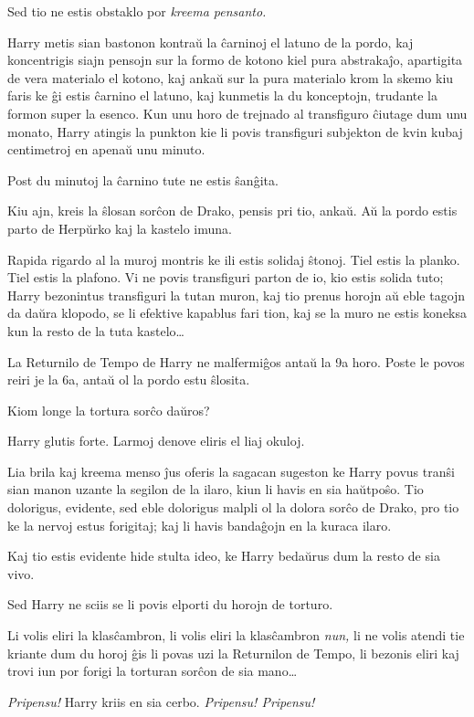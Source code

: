 Sed tio ne estis obstaklo por \emph{kreema pensanto.}

Harry metis sian bastonon kontraŭ la ĉarninoj el latuno de la pordo,
kaj koncentrigis siajn pensojn sur la formo de kotono kiel pura
abstrakaĵo, apartigita de vera materialo el kotono, kaj ankaŭ sur la
pura materialo krom la skemo kiu faris ke ĝi estis ĉarnino el latuno,
kaj kunmetis la du konceptojn, trudante la formon super la esenco. Kun
unu horo de trejnado al transfiguro ĉiutage dum unu monato, Harry
atingis la punkton kie li povis transfiguri subjekton de kvin kubaj
centimetroj en apenaŭ unu minuto.

Post du minutoj la ĉarnino tute ne estis ŝanĝita.

Kiu ajn, kreis la ŝlosan sorĉon de Drako, pensis pri tio, ankaŭ. Aŭ la
pordo estis parto de Herpŭrko kaj la kastelo imuna.

Rapida rigardo al la muroj montris ke ili estis solidaj ŝtonoj. Tiel
estis la planko. Tiel estis la plafono. Vi ne povis transfiguri parton
de io, kio estis solida tuto; Harry bezonintus transfiguri la tutan
muron, kaj tio prenus horojn aŭ eble tagojn da daŭra klopodo, se li
efektive kapablus fari tion, kaj se la muro ne estis koneksa kun la
resto de la tuta kastelo\ldots{}

La Returnilo de Tempo de Harry ne malfermiĝos antaŭ la 9a horo. Poste
le povos reiri je la 6a, antaŭ ol la pordo estu ŝlosita.

Kiom longe la tortura sorĉo daŭros?

Harry glutis forte. Larmoj denove eliris el liaj okuloj.

Lia brila kaj kreema menso ĵus oferis la sagacan sugeston ke Harry
povus tranŝi sian manon uzante la segilon de la ilaro, kiun li havis
en sia haŭtpoŝo. Tio dolorigus, evidente, sed eble dolorigus malpli ol
la dolora sorĉo de Drako, pro tio ke la nervoj estus forigitaj; kaj li
havis bandaĝojn en la kuraca ilaro.

Kaj tio estis evidente hide stulta ideo, ke Harry bedaŭrus dum la resto de sia vivo.

Sed Harry ne sciis se li povis elporti du horojn de torturo.

Li volis eliri la klasĉambron, li volis eliri la klasĉambron
\emph{nun,} li ne volis atendi tie kriante dum du horoj ĝis li povas
uzi la Returnilon de Tempo, li bezonis eliri kaj trovi iun por forigi
la torturan sorĉon de sia mano\ldots{}

\emph{Pripensu!} Harry kriis en sia cerbo. \emph{Pripensu! Pripensu!}

